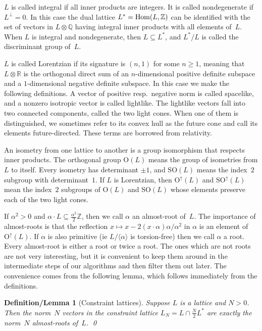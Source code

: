 \documentclass[12pt]{amsart}
\def\gend#1{\langle#1\rangle}
\def\R{\mathbb{R}}
\def\O{\mathrm{O}}
\def\SO{\mathrm{SO}}
\def\SOup{\SO^{\uparrow}}
\def\Oup{\O^{\uparrow}}
\def\Z{\mathbb{Z}}
\def\Q{\mathbb{Q}}
\def\tensor{\otimes}
\def\sset{\subseteq}
\def\Hom{\mathop{\rm Hom}\nolimits}
\def\SOup{\mathrm{SO}^{\uparrow}}
\numberwithin{theorem}{section}
\numberwithin{equation}{section}
\numberwithin{figure}{section}
\newtheorem{defnlemma}[theorem]{Definition/Lemma}
\theoremstyle{remark}
\begin{document}
$L$ is called integral if  all inner products are integers.
It is called nondegenerate if $L^\perp=0$.
In this case the dual lattice $L^*=\Hom(L,\Z)$ can be
identified with the set of vectors in
$L\tensor\Q$ having integral inner products with all elements of~$L$.
When $L$ is integral and nondegenerate, then $L\sset L^*$, and
$L^*/L$ is called the discriminant group of~$L$.

$L$ is called
Lorentzian if its signature is $(n,1)$ for some $n\geq1$, meaning
that $L\tensor\R$ is the orthogonal direct sum of an $n$-dimensional
positive definite subspace and a $1$-dimensional negative definite
subspace.  In this case we make the following definitions.
A vector of positive resp.\ negative norm is called spacelike,
and a nonzero isotropic vector is called lightlike.  
The lightlike vectors
fall into two connected components, called the two light cones.   
When one of them is distinguished, we sometimes refer to its
convex hull as the future cone and call its elements
future-directed.  These terms are borrowed
from relativity.

An isometry from one lattice to another is a group isomorphism
that respects inner products.  The orthogonal group $\O(L)$ means
the group of isometries from $L$ to itself.  
Every isometry has determinant $\pm1$, and $\SO(L)$ means the index~$2$
subgroup with 
determinant~$1$.  If $L$ is Lorentzian, then
$\Oup(L)$ and $\SOup(L)$ mean the index~$2$ subgroups
of $\O(L)$ and $\SO(L)$ whose elements preserve each of the two light cones.

If $\alpha^2>0$ and 
$\alpha\cdot L\sset \frac{\alpha^2}{2}\Z$, then we call $\alpha$ an almost-root of~$L$.  
The importance of almost-roots is that the reflection $x\mapsto x-2(x\cdot \alpha)\alpha/\alpha^2$
in $\alpha$ is an element of $\Oup(L)$.  If $\alpha$ is also primitive (ie $L/\gend{\alpha}$ is torsion-free)
then we
call $\alpha$ a root.  Every almost-root is either a root or twice a root.  
The ones which are not roots are not very 
interesting, but it is convenient to
keep them around in the intermediate steps of our algorithms and then 
filter them out later.  The convenience comes from the following lemma,
which follows immediately from the definitions.

\begin{defnlemma}[Constraint lattices]
    \label{LemConstraintLattices}
    Suppose $L$ is a lattice and $N>0$.  Then the norm~$N$ vectors in
    the \emph{constraint lattice}
    $L_N=L\cap\frac{N}{2}L^*$ are exactly the norm~$N$ almost-roots of~$L$.
    \qed
\end{defnlemma}
\end{document}
